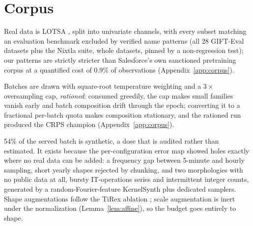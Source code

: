 \section{Corpus}
\label{sec:corpus}

Real data is LOTSA \citep{woo2024moirai}, split into univariate
channels, with every subset matching an evaluation benchmark excluded by
verified name patterns (all 28 GIFT-Eval datasets plus the Nixtla suite,
whole datasets, pinned by a non-regression test); our patterns are
strictly stricter than Salesforce's own sanctioned pretraining corpus at
a quantified cost of 0.9\% of observations
(Appendix~\ref{app:corpus}).

Batches are drawn with square-root temperature weighting and a $3\times$
oversampling cap, \emph{rationed}: consumed greedily, the cap makes
small families vanish early and batch composition drift through the
epoch; converting it to a fractional per-batch quota makes composition
stationary, and the rationed run produced the CRPS champion
(Appendix~\ref{app:corpus}).

54\% of the served batch is synthetic, a dose that is audited rather
than estimated. It exists because the per-configuration error map showed
holes exactly where no real data can be added: a frequency gap between
5-minute and hourly sampling, short yearly shapes rejected by chunking,
and two morphologies with no public data at all, bursty IT-operations
series and intermittent integer counts, generated by a
random-Fourier-feature KernelSynth
\citep{ansari2024chronos,rahimi2007rff} plus dedicated samplers.
Shape augmentations follow the TiRex ablation \citep{auer2025tirex};
scale augmentation is inert under the normalization
(Lemma~\ref{lem:affine}), so the budget goes entirely to shape.
